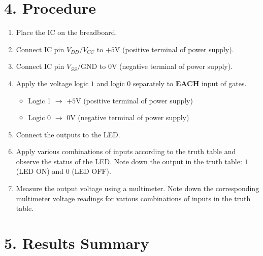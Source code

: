 \documentclass[a4paper, 12pt]{article}
\begin{document}
\section*{4. Procedure}
\begin{enumerate}[leftmargin=*]
    \item Place the IC on the breadboard.
    \item Connect IC pin $V_{DD} / V_{CC}$ to $+5\text{V}$ (positive terminal of power supply).
    \item Connect IC pin $V_{SS} / \text{GND}$ to $0\text{V}$ (negative terminal of power supply).
    \item Apply the voltage logic $1$ and logic $0$ separately to \textbf{EACH} input of gates.
    \begin{itemize}
        \item Logic 1 $\rightarrow$ $+5\text{V}$ (positive terminal of power supply)
        \item Logic 0 $\rightarrow$ $0\text{V}$ (negative terminal of power supply)
    \end{itemize}
    \item Connect the outputs to the LED.
    \item Apply various combinations of inputs according to the truth table and observe the status of the LED. Note down the output in the truth table: $1$ (LED ON) and $0$ (LED OFF).
    \item Measure the output voltage using a multimeter. Note down the corresponding multimeter voltage readings for various combinations of inputs in the truth table.
\end{enumerate}

\newpage

\section*{5. Results Summary}
\end{document}
